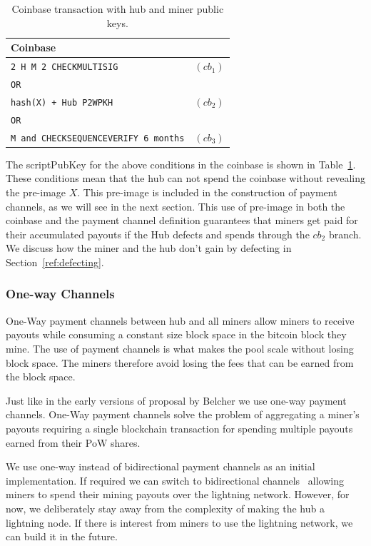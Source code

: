 \documentclass{article}
\begin{document}
\begin{table}
  \centering
  \begin{tabular}{ lr }
    \bfseries Coinbase \\
    \midrule
    \verb|2 H M 2 CHECKMULTISIG| & $(cb_1)$ \\
    \verb|OR| \\
    \verb|hash(X) + Hub P2WPKH| & $(cb_2)$ \\
    \verb|OR| \\
    \verb|M and CHECKSEQUENCEVERIFY 6 months| & $(cb_3)$\\ 
    \midrule
  \end{tabular}
  \caption{Coinbase transaction with hub and miner public keys.}\label{table:coinbase}
\end{table}

The scriptPubKey for the above conditions in the coinbase is shown in
Table~\ref{table:coinbase}. These conditions mean that the hub can not
spend the coinbase without revealing the pre-image $X$. This pre-image
is included in the construction of payment channels, as we will see in
the next section. This use of pre-image in both the coinbase and the
payment channel definition guarantees that miners get paid for their
accumulated payouts if the Hub defects and spends through the $cb_2$
branch. We discuss how the miner and the hub don't gain by defecting
in Section~\ref{ref:defecting}.

\subsubsection{One-way Channels}

One-Way payment channels between hub and all miners allow miners to
receive payouts while consuming a constant size block space in the
bitcoin block they mine. The use of payment channels is what makes the
pool scale without losing block space. The miners therefore avoid
losing the fees that can be earned from the block space.

Just like in the early versions of proposal by Belcher we use one-way
payment channels. One-Way payment channels solve the problem of
aggregating a miner's payouts requiring a single blockchain
transaction for spending multiple payouts earned from their PoW
shares.

We use one-way instead of bidirectional payment channels as an initial
implementation. If required we can switch to bidirectional
channels~\cite{poon2016bitcoin} allowing miners to spend their mining
payouts over the lightning network. However, for now, we deliberately
stay away from the complexity of making the hub a lightning node. If
there is interest from miners to use the lightning network, we can
build it in the future.
\end{document}
